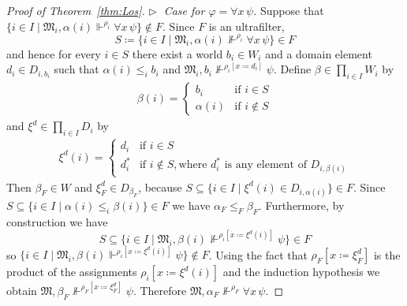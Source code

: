 \documentclass[submission,copyright,creativecommons]{eptcs}
\newcommand{\mo}{\mathfrak}
\renewcommand{\phi}{\varphi}
\newcommand{\satisfySym}{\Vdash}
\newcommand{\satisfy}[4]{#1, #2 \satisfySym^{#4} #3}
\newcommand{\notsatisfy}[4]{#1, #2 \not\Vdash^{#4} #3}
\begin{document}
\begin{proof}[Proof of Theorem~\ref{thm:Los}]
  \medskip\noindent
  \textit{$\triangleright\;$ Case for $\phi = \forall x\,\psi$.}
    Suppose that
    $\{ i \in I \mid \satisfy{\mo{M}_i}{\alpha(i)}{\forall x\,\psi}{\rho_i} \} \notin F$. 
    Since $F$ is an ultrafilter, 
    \begin{equation*}
      S \coloneq \{ i \in I \mid \notsatisfy{\mo{M}_i}{\alpha(i)}{\forall x\,\psi}{\rho_i}\} \in F
    \end{equation*}
    and hence for every $i \in S$ there exist a world $b_i \in W_i$ and a domain
    element $d_i \in D_{i,b_i}$ such that $\alpha(i) \leq_i b_i$
    and $\notsatisfy{\mo{M}_i}{b_i}{\psi}{\rho_i[x \coloneq d_i]}$.
    Define $\beta \in \prod_{i \in I} W_i$ by
    \begin{align*}
      \beta(i)
        = \begin{cases}
            b_i &\text{if } i \in S \\
            \alpha(i) &\text{if } i \notin S
          \end{cases}
    \end{align*}
    and $\xi^d \in \prod_{i \in I} D_i$ by
    \begin{align*}
      \xi^d(i)
        = \begin{cases}
            d_i   &\text{if } i \in S \\
            d^*_i &\text{if } i \notin S, \text{where } d^*_i \text{ is any element of } D_{i,\beta(i)}
          \end{cases}
    \end{align*}
    Then $\beta_F \in W$ and $\xi^d_F \in D_{\beta_F}$, because
    $S \subseteq \{ i \in I \mid \xi^d(i) \in D_{i, \alpha(i)} \} \in F$.
%
    Since $S \subseteq \{ i \in I \mid \alpha(i) \leq_i \beta(i) \} \in F$
    we have $\alpha_F \leq_F \beta_F$.
    Furthermore, by construction we have 
    \begin{equation*}
      S \subseteq \{ i \in I \mid \notsatisfy{\mo{M}_i}{\beta(i)}{\psi}{\rho_i[x \coloneq \xi^d(i)]} \} \in F
    \end{equation*}
    so $\{ i \in I \mid \satisfy{\mo{M}_i}{\beta(i)}{\psi}{\rho_i[x \coloneq \xi^d(i)]} \} \not\in F$.
    Using the fact that $\rho_F[x \coloneq \xi^d_F]$ is the product of
    the assignments $\rho_i[x \coloneq \xi^d(i)]$ and the induction hypothesis
    we obtain $\notsatisfy{\mo{M}}{\beta_F}{\psi}{\rho_F[x \coloneq \xi^d_F]}$.
    Therefore $\notsatisfy{\mo{M}}{\alpha_F}{\forall x\, \psi}{\rho_F}$.


\end{proof}
\end{document}
